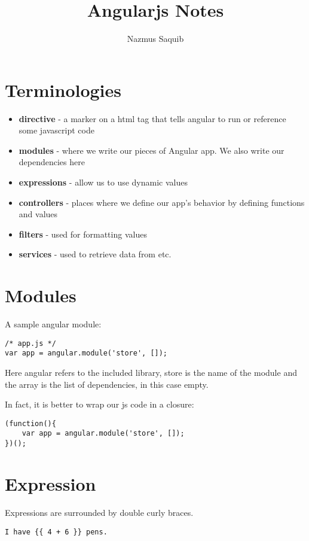 \documentclass[a4paper, 12pt]{article}
\begin{document}
\title{Angularjs Notes}
\author{Nazmus Saquib}

\maketitle
\tableofcontents

\section{Terminologies}
\begin{itemize}
	\item \textbf{directive} - a marker on a html tag that tells angular to run or reference some javascript code
	\item \textbf{modules} - where we write our pieces of Angular app. We also write our dependencies here
	\item \textbf{expressions} - allow us to use dynamic values
	\item \textbf{controllers} - places where we define our app's behavior by defining functions and values
	\item \textbf{filters} - used for formatting values
	\item \textbf{services} - used to retrieve data from etc.
\end{itemize}

\section{Modules}
A sample angular module:
\begin{verbatim}
/* app.js */
var app = angular.module('store', []);
\end{verbatim}
Here angular refers to the included library, store is the name of the module and the array is the list of dependencies, in this case empty.

In fact, it is better to wrap our js code in a closure:
\begin{verbatim}
(function(){
	var app = angular.module('store', []);
})();
\end{verbatim}

\section{Expression}
Expressions are surrounded by double curly braces.
\begin{verbatim}
I have {{ 4 + 6 }} pens.
\end{verbatim}
\end{document}
